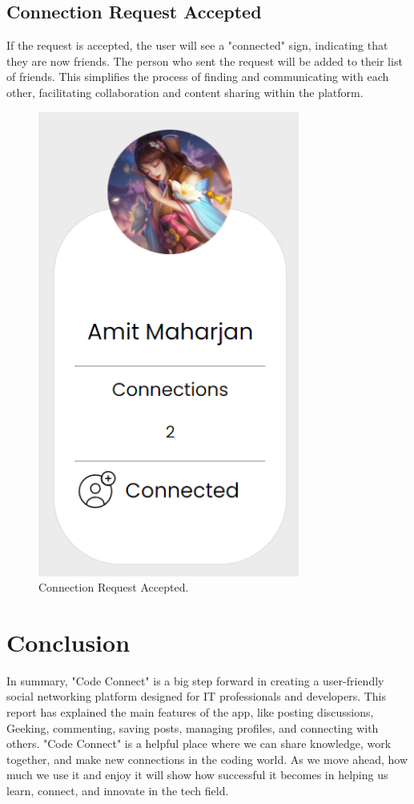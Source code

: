 \subsection{Connection Request Accepted}
If the request is accepted, the user will see a "connected" sign, indicating that they are now friends. The person who sent the request will be added to their list of friends. This simplifies the process of finding and communicating with each other, facilitating collaboration and content sharing within the platform.
\begin{figure}[H]
    \centering
    \includegraphics[height=0.25\textheight]{Outcome-ss/result-after-accepting.png}
    \caption{Connection Request Accepted.}
    \label{fig:Connection Request Accepted}
\end{figure}

\section{Conclusion}
In summary, "Code Connect" is a big step forward in creating a user-friendly social networking platform designed for IT professionals and developers. This report has explained the main features of the app, like posting discussions, Geeking, commenting, saving posts, managing profiles, and connecting with others. "Code Connect" is a helpful place where we can share knowledge, work together, and make new connections in the coding world. As we move ahead, how much we use it and enjoy it will show how successful it becomes in helping us learn, connect, and innovate in the tech field.

